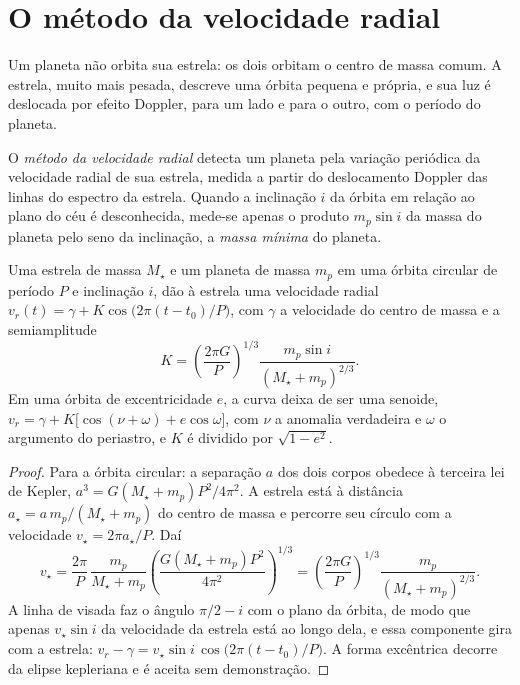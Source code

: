 \section{O método da velocidade radial}\label{sec:b3:exoplanets:rv}

Um planeta não orbita sua estrela: os dois orbitam o centro de massa comum.
A estrela, muito mais pesada, descreve uma órbita pequena e própria, e sua luz
é deslocada por efeito Doppler, para um lado e para o outro, com o período do planeta.

\begin{definition}\label{def:b3:exoplanets:rv}
O \emph{método da velocidade radial} detecta um
planeta pela variação periódica da velocidade radial de sua estrela,
medida a partir do deslocamento Doppler das linhas do espectro da estrela. Quando
a inclinação $i$ da órbita em relação ao plano do céu é desconhecida, mede-se
apenas o produto $m_p\sin i$ da massa do planeta pelo seno da inclinação, a
\emph{massa mínima} do
planeta.
\end{definition}

\begin{theorem}\label{thm:b3:exoplanets:semi-amplitude}
Uma estrela de massa $M_\star$ e um planeta de massa $m_p$ em uma órbita circular de
período $P$ e inclinação $i$, dão à estrela uma velocidade radial
$v_r(t) = \gamma + K\cos\bigl(2\pi(t - t_0)/P\bigr)$, com $\gamma$ a
velocidade do centro de massa e a semiamplitude
\[
K = \left(\frac{2\pi G}{P}\right)^{1/3}
    \frac{m_p\sin i}{(M_\star + m_p)^{2/3}} .
\]
Em uma órbita de excentricidade $e$, a curva deixa de ser uma senoide,
$v_r = \gamma + K\bigl[\cos(\nu + \omega) + e\cos\omega\bigr]$, com $\nu$
a anomalia verdadeira e $\omega$ o argumento do periastro, e $K$ é
dividido por $\sqrt{1 - e^2}$.
\end{theorem}

\begin{proof}
Para a órbita circular: a separação $a$ dos dois corpos obedece
à terceira lei de Kepler, $a^3 = G(M_\star + m_p)P^2/4\pi^2$. A estrela está
à distância $a_\star = a\,m_p/(M_\star + m_p)$ do centro de massa e
percorre seu círculo com a velocidade $v_\star = 2\pi a_\star/P$. Daí
\[
v_\star = \frac{2\pi}{P}\,\frac{m_p}{M_\star + m_p}
          \left(\frac{G(M_\star + m_p)P^2}{4\pi^2}\right)^{1/3}
        = \left(\frac{2\pi G}{P}\right)^{1/3}\frac{m_p}{(M_\star + m_p)^{2/3}} .
\]
A linha de visada faz o ângulo $\pi/2 - i$ com o plano da
órbita, de modo que apenas $v_\star\sin i$ da velocidade da estrela está ao longo dela, e
essa componente gira com a estrela: $v_r - \gamma = v_\star\sin i\,
\cos\bigl(2\pi(t - t_0)/P\bigr)$. A forma excêntrica decorre da
elipse kepleriana e é aceita sem demonstração.
\end{proof}

